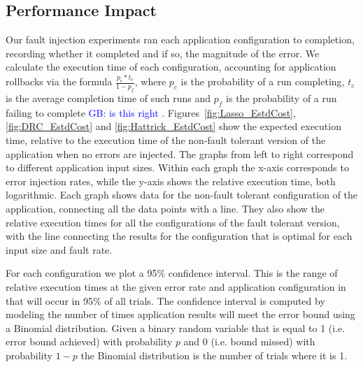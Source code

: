\documentclass{sig-alternate}
\newcommand{\sui}[1]{%
  \textcolor{green}{SC - #1}
}
\newcommand{\greg}[1]{%
  \textcolor{blue}{GB: #1}
}
\begin{document}
{%

\subsection{Performance Impact}
\label{sec:eval:perf}

Our fault injection experiments ran each application configuration to completion, recording whether it completed and if so, the magnitude of the error.
We calculate the execution time of each configuration, accounting for application rollbacks via the formula $\frac{p_c*t_c}{1-p_f}$, where $p_c$ is the probability of a run completing, $t_c$ is the average completion time of such runs and $p_f$ is the probability of a run failing to complete\greg{is this right}.
Figures~\ref{fig:Lasso_EstdCost}, \ref{fig:DRC_EstdCost} and \ref{fig:Hattrick_EstdCost} show the expected execution time, relative to the execution time of the non-fault tolerant version of the application when no errors are injected.
The graphs from left to right correspond to different application input sizes.
Within each graph the x-axis corresponds to error injection rates, while the y-axis shows the relative execution time, both logarithmic.
Each graph shows data for the non-fault tolerant configuration of the application, connecting all the data points with a line.
They also show the relative execution times for all the configurations of the fault tolerant version, with the line connecting the results for the configuration that is optimal for each input size and fault rate.

For each configuration we plot a 95\% confidence interval.
This is the range of relative execution times at the given error rate and application configuration in that will occur in 95\% of all trials.
The confidence interval is computed by modeling the number of times application results will meet the error bound using a Binomial distribution.
Given a binary random variable that is equal to 1 (i.e. error bound achieved) with probability $p$ and 0 (i.e. bound missed) with probability $1-p$ the Binomial distribution is the number of trials where it is 1.

}
\end{document}
